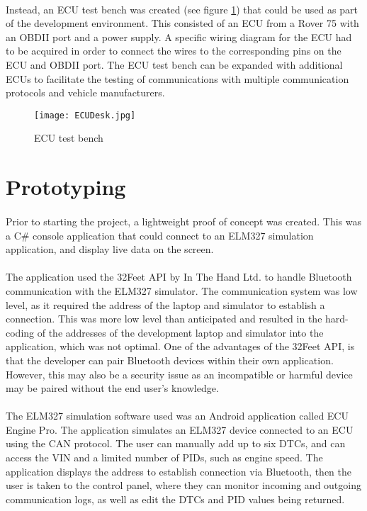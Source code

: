 {	\paragraph{}{
	Instead, an ECU test bench was created (see figure \ref{fig:TestBench}) that could be used as part of the development environment. This consisted of an ECU from a Rover 75 with an OBDII port and a power supply. A specific wiring diagram for the ECU had to be acquired in order to connect the wires to the corresponding pins on the ECU and OBDII port. The ECU test bench can be expanded with additional ECUs to facilitate the testing of communications with multiple communication protocols and vehicle manufacturers.
	}	
	
	\begin{figure}[h]
		\begin{center}										
				\texttt{[image: ECUDesk.jpg]}
				\caption{ECU test bench}
				\label{fig:TestBench}
		\end{center}
	\end{figure}
}
\label{sec:DeveEnv}

\section{Prototyping}
	\paragraph{}{
	Prior to starting the project, a lightweight proof of concept was created. This was a C{\#} console application that could connect to an ELM327 simulation application, and display live data on the screen. 
	}
	\paragraph{}{ %
	The application used the 32Feet API by In The Hand Ltd. to handle Bluetooth communication with the ELM327 simulator. The communication system was low level, as it required the address of the laptop and simulator to establish a connection. This was more low level than anticipated and resulted in the hard-coding of the addresses of the development laptop and simulator into the application, which was not optimal. One of the advantages of the 32Feet API, is that the developer can pair Bluetooth devices within their own application. However, this may also be a security issue as an incompatible or harmful device may be paired without the end user's knowledge.
	}
	\paragraph{}{
	The ELM327 simulation software used was an Android application called ECU Engine Pro. The application simulates an ELM327 device connected to an ECU using the CAN protocol. The user can manually add up to six DTCs, and can access the VIN and a limited number of PIDs, such as engine speed. The application displays the address to establish connection via Bluetooth, then the user is taken to the control panel, where they can monitor incoming and outgoing communication logs, as well as edit the DTCs and PID values being returned.
	}
